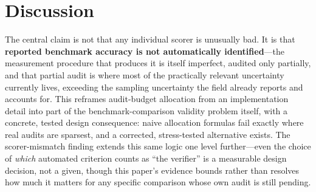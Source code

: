 \section{Discussion}
\label{sec:discussion}

The central claim is not that any individual scorer is unusually bad. It is
that \textbf{reported benchmark accuracy is not automatically identified}---the
measurement procedure that produces it is itself imperfect, audited only
partially, and that partial audit is where most of the practically relevant
uncertainty currently lives, exceeding the sampling uncertainty the field
already reports and accounts for. This reframes audit-budget allocation from
an implementation detail into part of the benchmark-comparison validity
problem itself, with a concrete, tested design consequence: naive allocation
formulas fail exactly where real audits are sparsest, and a corrected,
stress-tested alternative exists. The scorer-mismatch finding extends this
same logic one level further---even the choice of \emph{which} automated
criterion counts as ``the verifier'' is a measurable design decision, not a
given, though this paper's evidence bounds rather than resolves how much it
matters for any specific comparison whose own audit is still pending.
